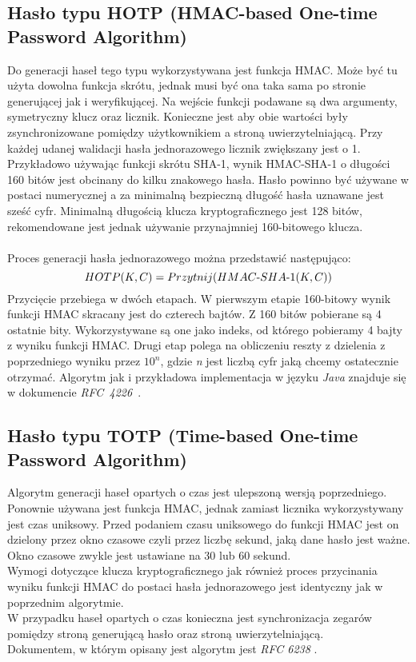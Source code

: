 \subsection{Hasło typu HOTP (HMAC-based One-time Password Algorithm)} \label{truncate}
Do generacji haseł tego typu wykorzystywana jest funkcja HMAC. Może być tu użyta dowolna funkcja skrótu, jednak 
musi być ona taka sama po stronie generującej jak i weryfikującej. 
Na wejście funkcji podawane są dwa argumenty, symetryczny klucz oraz licznik. 
Konieczne jest aby obie wartości były zsynchronizowane pomiędzy użytkownikiem a stroną uwierzytelniającą. 
Przy każdej udanej walidacji hasła jednorazowego licznik zwiększany jest o 1. \\
Przykładowo używając funkcji skrótu SHA-1, wynik HMAC-SHA-1 o długości 160 bitów jest obcinany do kilku znakowego hasła. 
Hasło powinno być używane w postaci numerycznej a za minimalną bezpieczną długość hasła uznawane jest sześć cyfr.
Minimalną długością klucza kryptograficznego jest 128 bitów, rekomendowane jest jednak używanie przynajmniej 160-bitowego 
klucza. \\ \\
Proces generacji hasła jednorazowego można przedstawić następująco: \\
$$HOTP(K, C) = Przytnij(\mathop{\mbox{$HMAC$-$SHA$-$1$}}(K, C))$$
Przycięcie przebiega w dwóch etapach. W pierwszym etapie 160-bitowy wynik funkcji HMAC skracany jest do czterech bajtów.
Z 160 bitów pobierane są 4 ostatnie bity. 
Wykorzystywane są one jako indeks, od którego pobieramy 4 bajty z wyniku funkcji HMAC.
Drugi etap polega na obliczeniu reszty z dzielenia z poprzedniego wyniku przez $10^n$, gdzie \textit{n} jest 
liczbą cyfr jaką chcemy ostatecznie otrzymać. Algorytm jak i przykładowa implementacja w języku \textit{Java} znajduje się w dokumencie \textit{RFC~4226}~\cite{hotprfc}.

\subsection{Hasło typu TOTP (Time-based One-time Password Algorithm)}
Algorytm generacji haseł opartych o czas jest ulepszoną wersją poprzedniego. 
Ponownie używana jest funkcja HMAC, jednak zamiast licznika wykorzystywany jest czas uniksowy.
Przed podaniem czasu uniksowego do funkcji HMAC jest on dzielony przez okno czasowe czyli 
przez liczbę sekund, jaką dane hasło jest ważne. 
Okno czasowe zwykle jest ustawiane na 30 lub 60 sekund. \\
Wymogi dotyczące klucza kryptograficznego jak również proces przycinania wyniku funkcji HMAC 
do postaci hasła jednorazowego jest identyczny jak w poprzednim algorytmie. \\
W przypadku haseł opartych o czas konieczna jest synchronizacja zegarów pomiędzy stroną generującą hasło
oraz stroną uwierzytelniającą. \\
Dokumentem, w którym opisany jest algorytm jest \textit{RFC 6238} \cite{totprfc}.

